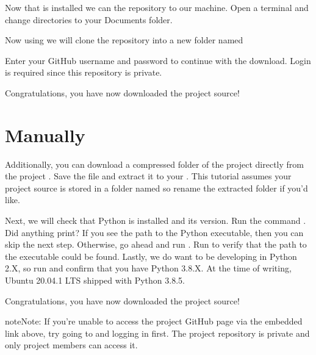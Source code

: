 \documentclass[letterpaper,10pt,english]{sphinxmanual}
\begin{document}
Now that  is installed we can  the repository to our machine. Open a terminal and change directories
to your Documents folder.


Now using  we will clone the repository into a new folder named 


Enter your GitHub username and password to continue with the download. Login is required since this repository is
private.

Congratulations, you have now downloaded the project source!


\section{Manually}
\label{\detokenize{newuser:manually}}
Additionally, you can download a compressed  folder of the project directly from the project
. Save the  file and extract
it to your . This tutorial assumes your project source is stored in a folder named  so rename
the extracted folder if you’d like.

Next, we will check that Python is installed and its version. Run the command . Did anything print?
If you see the path to the Python executable, then you can skip the next step. Otherwise, go ahead and run
.  Run  to verify that the path to the  executable
could be found. Lastly, we do  want to be developing in Python 2.X, so run  and confirm
that you have Python 3.8.X. At the time of writing, Ubuntu 20.04.1 LTS shipped with Python 3.8.5.

Congratulations, you have now downloaded the project source!

\begin{sphinxadmonition}{note}{Note:}
If you’re unable to access the project GitHub page via the embedded link above, try going to
 and logging in first. The project repository is private and only project
members can access it.
\end{sphinxadmonition}
\end{document}
